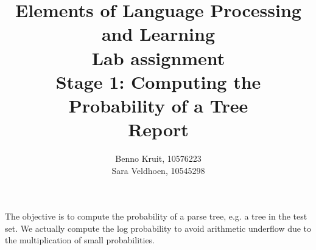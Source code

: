 \documentclass{article}
\title{Elements of Language Processing and Learning\\
Lab assignment \\
Stage 1: Computing the Probability of a Tree\\
Report}
\author{Benno Kruit, 10576223\\Sara Veldhoen, 10545298}
\begin{document}
\maketitle

The objective is to compute the probability of a parse tree, e.g. a tree in the test set. 
We actually compute the log probability to avoid arithmetic underflow due to the multiplication of small probabilities. 
\end{document}
